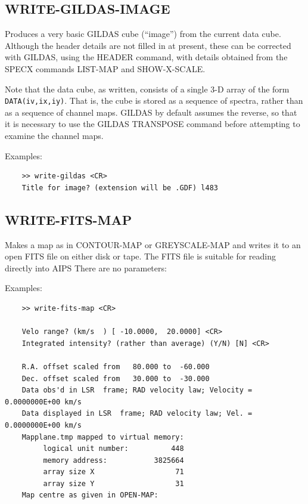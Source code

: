 \documentclass[11pt,twoside]{report}
\begin{document}
\subsection{WRITE-GILDAS-IMAGE}

Produces a very basic GILDAS cube (``image'') from the current data cube.
Although the header details are not filled in at present, these can be
corrected with GILDAS, using the HEADER command, with details obtained from
the SPECX commands LIST-MAP and SHOW-X-SCALE.

Note that the data cube, as written, consists of a single 3-D array
of the form \verb+DATA(iv,ix,iy)+. That is, the cube is stored as a
sequence of spectra, rather than as a sequence of channel maps. GILDAS
by default assumes the reverse, so that it is necessary to use the GILDAS
TRANSPOSE command before attempting to examine the channel maps.

Examples:
\begin{verbatim}
    >> write-gildas <CR>
    Title for image? (extension will be .GDF) l483
\end{verbatim}

\subsection{WRITE-FITS-MAP} 

Makes a map as in CONTOUR-MAP or GREYSCALE-MAP and writes it
to an open FITS file on either disk or tape. The FITS file is
suitable for reading directly into AIPS
There are no parameters:

Examples:
\begin{verbatim}
    >> write-fits-map <CR>

    Velo range? (km/s  ) [ -10.0000,  20.0000] <CR>
    Integrated intensity? (rather than average) (Y/N) [N] <CR>

    R.A. offset scaled from   80.000 to  -60.000
    Dec. offset scaled from   30.000 to  -30.000
    Data obs'd in LSR  frame; RAD velocity law; Velocity =   0.0000000E+00 km/s
    Data displayed in LSR  frame; RAD velocity law; Vel. =   0.0000000E+00 km/s
    Mapplane.tmp mapped to virtual memory:
         logical unit number:          448
         memory address:           3825664
         array size X                   71
         array size Y                   31
    Map centre as given in OPEN-MAP:
\end{verbatim}
\end{document}
